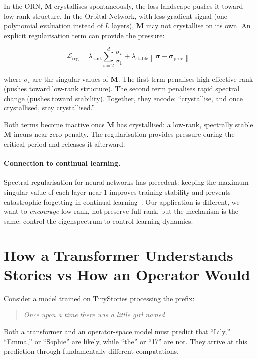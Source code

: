 \documentclass[11pt, a4paper]{article}
\newcommand{\M}{\mathbf{M}}
\newcommand{\norm}[1]{\left\| #1 \right\|}
\theoremstyle{plain}
\theoremstyle{definition}
\theoremstyle{remark}
\begin{document}
In the ORN, $\M$ crystallises spontaneously, the loss landscape pushes it toward low-rank structure.
In the Orbital Network, with less gradient signal (one polynomial evaluation instead of $L$ layers), $\M$ may not crystallise on its own.
An explicit regularisation term can provide the pressure:

\begin{equation}
\label{eq:spectral-reg}
\mathcal{L}_{\mathrm{reg}} = \lambda_{\mathrm{rank}} \sum_{i=2}^{d} \frac{\sigma_i}{\sigma_1} + \lambda_{\mathrm{stable}} \norm{\boldsymbol\sigma - \boldsymbol\sigma_{\mathrm{prev}}}
\end{equation}

where $\sigma_i$ are the singular values of $\M$.
The first term penalises high effective rank (pushes toward low-rank structure).
The second term penalises rapid spectral change (pushes toward stability).
Together, they encode: ``crystallise, and once crystallised, stay crystallised.''

Both terms become inactive once $\M$ has crystallised: a low-rank, spectrally stable $\M$ incurs near-zero penalty.
The regularisation provides pressure during the critical period and releases it afterward.

\paragraph{Connection to continual learning.}
Spectral regularisation for neural networks has precedent: keeping the maximum singular value of each layer near 1 improves training stability and prevents catastrophic forgetting in continual learning~\cite{titsias2025spectral}.
Our application is different, we want to \emph{encourage} low rank, not preserve full rank, but the mechanism is the same: control the eigenspectrum to control learning dynamics.


\section{How a Transformer Understands Stories vs How an Operator Would}
\label{sec:stories}

Consider a model trained on TinyStories processing the prefix:
\begin{quote}
\textit{Once upon a time there was a little girl named}
\end{quote}

Both a transformer and an operator-space model must predict that ``Lily,'' ``Emma,'' or ``Sophie'' are likely, while ``the'' or ``17'' are not.
They arrive at this prediction through fundamentally different computations.
\end{document}
